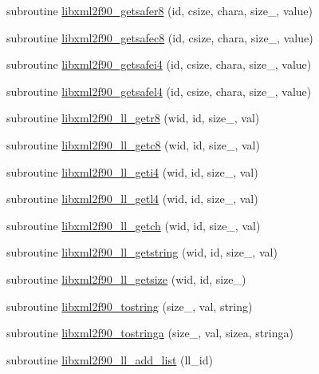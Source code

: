 \begin{DoxyCompactItemize}
\item 
subroutine \hyperlink{libxml2f90_8f90__pp_8f90_a7851da50fe7a6768aa6f0d04aa9345a0}{libxml2f90\+\_\+getsafer8} (id, csize, chara, size\+\_\+, value)
\item 
subroutine \hyperlink{libxml2f90_8f90__pp_8f90_a9ba5ab680800c28b4f9d6ceb0e8aa3f4}{libxml2f90\+\_\+getsafec8} (id, csize, chara, size\+\_\+, value)
\item 
subroutine \hyperlink{libxml2f90_8f90__pp_8f90_ac813de3235a2af4f169c5434743f86a2}{libxml2f90\+\_\+getsafei4} (id, csize, chara, size\+\_\+, value)
\item 
subroutine \hyperlink{libxml2f90_8f90__pp_8f90_a28f8b34bc930ad861c2ee4d764f945ba}{libxml2f90\+\_\+getsafel4} (id, csize, chara, size\+\_\+, value)
\item 
subroutine \hyperlink{libxml2f90_8f90__pp_8f90_abf76069613613425c0bc9539a51cd4d9}{libxml2f90\+\_\+ll\+\_\+getr8} (wid, id, size\+\_\+, val)
\item 
subroutine \hyperlink{libxml2f90_8f90__pp_8f90_a6a5ed182d7a75ff001e4372fb131e07c}{libxml2f90\+\_\+ll\+\_\+getc8} (wid, id, size\+\_\+, val)
\item 
subroutine \hyperlink{libxml2f90_8f90__pp_8f90_a06d3fe6d9c7cd1a6044e617b8a2acdb9}{libxml2f90\+\_\+ll\+\_\+geti4} (wid, id, size\+\_\+, val)
\item 
subroutine \hyperlink{libxml2f90_8f90__pp_8f90_a71e6fc3f5a24b380986614bd6ff2ca9a}{libxml2f90\+\_\+ll\+\_\+getl4} (wid, id, size\+\_\+, val)
\item 
subroutine \hyperlink{libxml2f90_8f90__pp_8f90_a4f559755e5ceb6b3e6c845315d74ea7c}{libxml2f90\+\_\+ll\+\_\+getch} (wid, id, size\+\_\+, val)
\item 
subroutine \hyperlink{libxml2f90_8f90__pp_8f90_adbc34014dab0a252a634da0e15d1ae7d}{libxml2f90\+\_\+ll\+\_\+getstring} (wid, id, size\+\_\+, val)
\item 
subroutine \hyperlink{libxml2f90_8f90__pp_8f90_acfe9271d1d35656ab0b7c9ab2d303476}{libxml2f90\+\_\+ll\+\_\+getsize} (wid, id, size\+\_\+)
\item 
subroutine \hyperlink{libxml2f90_8f90__pp_8f90_ad6bcb9b8b86b4f88c534b842dc1bd9a1}{libxml2f90\+\_\+tostring} (size\+\_\+, val, string)
\item 
subroutine \hyperlink{libxml2f90_8f90__pp_8f90_a33b51f94ad4a4b0fabdf48039bd6a849}{libxml2f90\+\_\+tostringa} (size\+\_\+, val, sizea, stringa)
\item 
subroutine \hyperlink{libxml2f90_8f90__pp_8f90_a1eaede8d08ffde30b3ef74f657ac0126}{libxml2f90\+\_\+ll\+\_\+add\+\_\+list} (ll\+\_\+id)

\end{DoxyCompactItemize}
